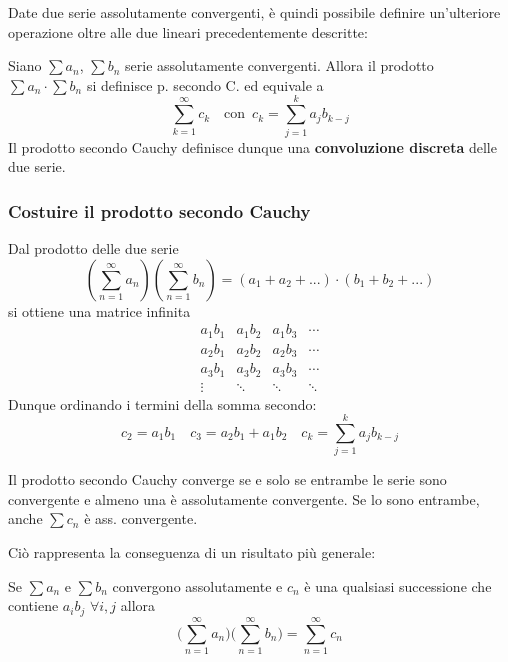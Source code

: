 \documentclass[10pt, oneside]{book}
\theoremstyle{plain}
\begin{document}
Date due serie assolutamente convergenti, è quindi possibile definire un'ulteriore operazione oltre alle due lineari precedentemente descritte:
\begin{defin}
Siano $\sum a_n$, $\sum b_n$ serie assolutamente convergenti. Allora il prodotto $\sum a_n \cdot \sum b_n$ si definisce p. secondo C. ed equivale a 
\[\sum\limits_{k=1}^{\infty} c_k \quad \textrm{con} \enspace c_k = \sum\limits_{j=1}^{k} a_j b_{k - j}\]
Il prodotto secondo Cauchy definisce dunque una \textbf{convoluzione discreta} delle due serie.
\end{defin}
\subsubsection{Costuire il prodotto secondo Cauchy} Dal prodotto delle due serie
\[(\sum \limits_{n=1}^{\infty}a_n)(\sum \limits_{n=1}^{\infty}b_n) = (a_1 + a_2 + ...) \cdot (b_1 + b_2 + ...)\]
si ottiene una matrice infinita
\[\begin{matrix}
    a_1 b_1 & a_1 b_2 & a_1 b_3 &\cdots \\
    a_2 b_1 & a_2 b_2 & a_2 b_3 & \cdots \\
    a_3 b_1 & a_3 b_2 & a_3 b_3 & \cdots \\
    \vdots & \ddots & \ddots & \ddots 
\end{matrix}\]
Dunque ordinando i termini della somma secondo:
\[c_2 = a_1 b_1 \quad c_3 = a_2 b_1 + a_1 b_2 \quad c_k = \sum\limits_{j=1}^{k} a_j b_{k - j}\]
\begin{ther}
    Il prodotto secondo Cauchy converge se e solo se entrambe le serie sono convergente e almeno una è assolutamente convergente. Se lo sono entrambe, anche $\sum c_n$ è ass. convergente.
\end{ther}
Ciò rappresenta la conseguenza di un risultato più generale:
\begin{ther}
    Se $\sum a_n$ e $\sum b_n$ convergono assolutamente e $c_n$ è una qualsiasi successione che contiene $a_i b_j$ $\forall i, j$ allora
    \[\bigg(\sum \limits_{n=1}^\infty a_n \bigg)\bigg(\sum \limits_{n=1}^\infty b_n\bigg) = \sum \limits_{n=1}^\infty c_n\]
\end{ther}
\end{document}
